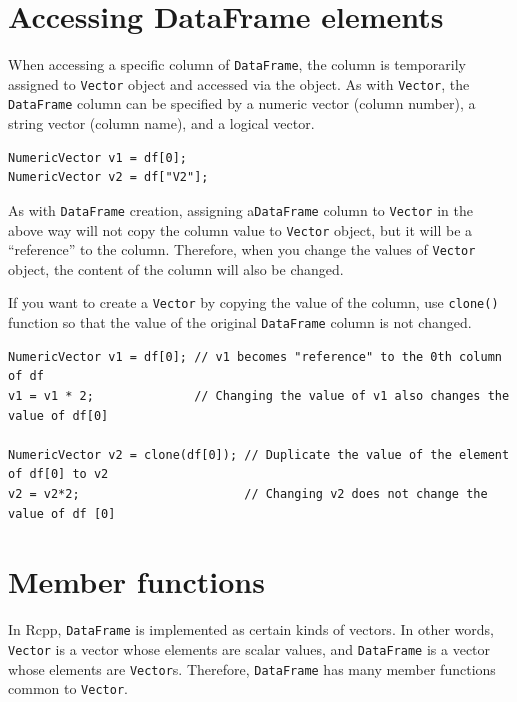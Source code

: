 \documentclass[]{book}
\begin{document}
\hypertarget{accessing-dataframe-elements}{%
\section{Accessing DataFrame elements}\label{accessing-dataframe-elements}}

When accessing a specific column of \texttt{DataFrame}, the column is temporarily assigned to \texttt{Vector} object and accessed via the object. As with \texttt{Vector}, the \texttt{DataFrame} column can be specified by a numeric vector (column number), a string vector (column name), and a logical vector.

\begin{verbatim}
NumericVector v1 = df[0];
NumericVector v2 = df["V2"];
\end{verbatim}

As with \texttt{DataFrame} creation, assigning a\texttt{DataFrame} column to \texttt{Vector} in the above way will not copy the column value to \texttt{Vector} object, but it will be a ``reference'' to the column. Therefore, when you change the values of \texttt{Vector} object, the content of the column will also be changed.

If you want to create a \texttt{Vector} by copying the value of the column, use \texttt{clone()} function so that the value of the original \texttt{DataFrame} column is not changed.

\begin{verbatim}
NumericVector v1 = df[0]; // v1 becomes "reference" to the 0th column of df
v1 = v1 * 2;              // Changing the value of v1 also changes the value of df[0]

NumericVector v2 = clone(df[0]); // Duplicate the value of the element of df[0] to v2
v2 = v2*2;                       // Changing v2 does not change the value of df [0]
\end{verbatim}

\hypertarget{member-functions-2}{%
\section{Member functions}\label{member-functions-2}}

In Rcpp, \texttt{DataFrame} is implemented as certain kinds of vectors. In other words, \texttt{Vector} is a vector whose elements are scalar values, and \texttt{DataFrame} is a vector whose elements are \texttt{Vector}s. Therefore, \texttt{DataFrame} has many member functions common to \texttt{Vector}.
\end{document}
